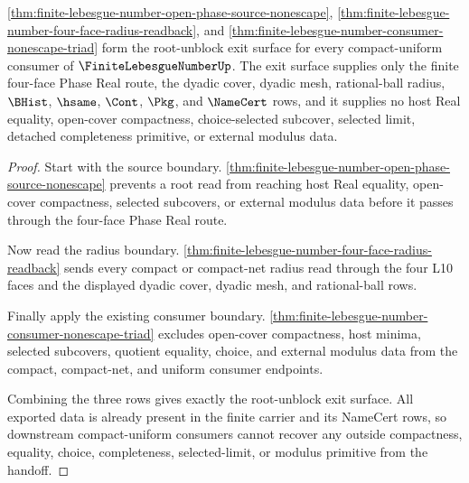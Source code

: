 \begin{theorem}
\label{thm:finite-lebesgue-number-root-unblock-exit-triad}
\autoref{thm:finite-lebesgue-number-open-phase-source-nonescape}, \autoref{thm:finite-lebesgue-number-four-face-radius-readback}, and \autoref{thm:finite-lebesgue-number-consumer-nonescape-triad} form the root-unblock exit surface for every compact-uniform consumer of $\FiniteLebesgueNumberUp$. The exit surface supplies only the finite four-face Phase Real route, the dyadic cover, dyadic mesh, rational-ball radius, $\BHist$, $\hsame$, $\Cont$, $\Pkg$, and $\NameCert$ rows, and it supplies no host Real equality, open-cover compactness, choice-selected subcover, selected limit, detached completeness primitive, or external modulus data.
\end{theorem}
\begin{proof}
Start with the source boundary. \autoref{thm:finite-lebesgue-number-open-phase-source-nonescape} prevents a root read from reaching host Real equality, open-cover compactness, selected subcovers, or external modulus data before it passes through the four-face Phase Real route.

Now read the radius boundary. \autoref{thm:finite-lebesgue-number-four-face-radius-readback} sends every compact or compact-net radius read through the four L10 faces and the displayed dyadic cover, dyadic mesh, and rational-ball rows.

Finally apply the existing consumer boundary. \autoref{thm:finite-lebesgue-number-consumer-nonescape-triad} excludes open-cover compactness, host minima, selected subcovers, quotient equality, choice, and external modulus data from the compact, compact-net, and uniform consumer endpoints.

Combining the three rows gives exactly the root-unblock exit surface. All exported data is already present in the finite carrier and its NameCert rows, so downstream compact-uniform consumers cannot recover any outside compactness, equality, choice, completeness, selected-limit, or modulus primitive from the handoff.
\end{proof}
